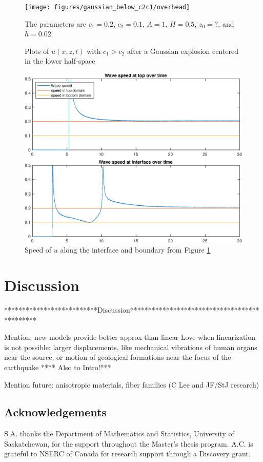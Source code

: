 \documentclass[11pt,letter,subeqn,fleqn]{article}
\numberwithin{equation}{section}
\numberwithin{table}{section}
\numberwithin{figure}{section}
\begin{document}
\begin{figure}[htbp]
	\caption{Plots of $u(x,z,t)$ with $c_1>c_2$ after a Gaussian explosion centered in the lower half-space}
	\label{fig:gaussian_below_c2c1}
	\texttt{[image: figures/gaussian\_below\_c2c1/overhead]}
\footnotesize
\centering

The parameters are $c_1 = 0.2$, $c_2 = 0.1$, $A=1$, $H=0.5$, $z_0=?$, and $h = 0.02$.
\end{figure}

\begin{figure}[htbp]
	\caption{Speed of $u$ along the interface and boundary from Figure \ref{fig:gaussian_below_c2c1}}
	\label{fig:gaussian_below_c2c1_speed}
	\includegraphics[width=0.7\linewidth]{figures/gaussian_below_c2c1/wavespeeds}
\footnotesize
\centering

\end{figure}



\section{Discussion}\label{sec:Discussion}

**************************Discussion*********************************************

Mention: new models provide better approx than linear Love when linearization is not possible: larger displacements, like mechanical vibrations of human organs near the source, or motion of geological formations near the focus of the earthquake **** Also to Intro!***


Mention future: anisotropic materials, fiber families (C Lee and JF/StJ research)


\subsection*{Acknowledgements}

S.A. thanks the Department of Mathematics and Statistics, University of Saskatchewan, for the support throughout the Master's thesis program. A.C. is grateful to NSERC of Canada for research support through a Discovery grant.

{\footnotesize
%


}
\end{document}
